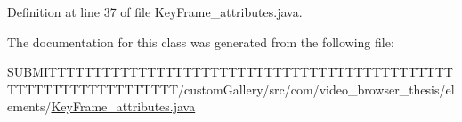 Definition at line 37 of file Key\-Frame\-\_\-attributes.\-java.



The documentation for this class was generated from the following file\-:\begin{DoxyCompactItemize}
\item 
S\-U\-B\-M\-I\-T\-T\-T\-T\-T\-T\-T\-T\-T\-T\-T\-T\-T\-T\-T\-T\-T\-T\-T\-T\-T\-T\-T\-T\-T\-T\-T\-T\-T\-T\-T\-T\-T\-T\-T\-T\-T\-T\-T\-T\-T\-T\-T\-T\-T\-T\-T\-T\-T\-T\-T\-T\-T\-T\-T\-T\-T\-T\-T\-T\-T\-T\-T\-T/custom\-Gallery/src/com/video\-\_\-browser\-\_\-thesis/elements/\hyperlink{_key_frame__attributes_8java}{Key\-Frame\-\_\-attributes.\-java}\end{DoxyCompactItemize}
